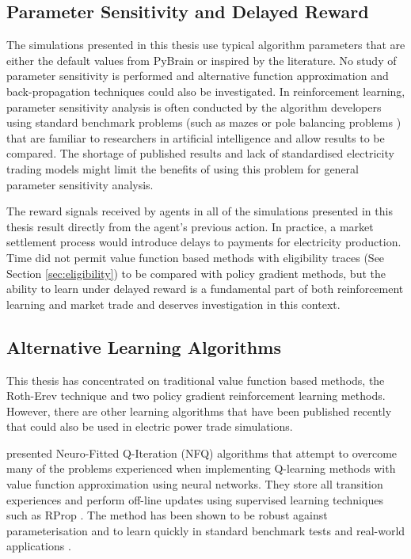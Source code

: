 \subsection{Parameter Sensitivity and Delayed Reward}
The simulations presented in this thesis use typical algorithm parameters that
are either the default values from PyBrain or inspired by the literature. No
study of parameter sensitivity is performed and alternative function
approximation and back-propagation techniques could also be investigated. In
reinforcement learning, parameter sensitivity analysis is often conducted by the
algorithm developers using standard benchmark problems (such as mazes or pole
balancing problems \cite{schaul:2010}) that are familiar to researchers in
artificial intelligence and allow results to be compared. The shortage of
published results and lack of standardised electricity trading models might
limit the benefits of using this problem for general parameter sensitivity
analysis.

The reward signals received by agents in all of the simulations presented in
this thesis result directly from the agent's previous action.  In
practice, a market settlement process would introduce delays to payments for
electricity production. Time did not permit value function based methods with
eligibility traces (See Section \ref{sec:eligibility}) to be compared with
policy gradient methods, but the ability to learn under delayed reward is a
fundamental part of both reinforcement learning and market trade and deserves
investigation in this context.


\subsection{Alternative Learning Algorithms}
This thesis has concentrated on traditional value function based methods, the
Roth-Erev technique and two policy gradient reinforcement learning methods.
However, there are other learning algorithms that have been published recently
that could also be used in electric power trade simulations.

 presented Neuro-Fitted Q-Iteration (NFQ)
algorithms that attempt to overcome many of the problems experienced when implementing
Q-learning methods with value function approximation using neural networks.
They store all transition experiences and perform off-line updates using
supervised learning techniques such as RProp \cite{riedmiller93}.  The method
has been shown to be robust against parameterisation and to learn quickly in
standard benchmark tests and real-world applications \cite{kietzmann09}.

